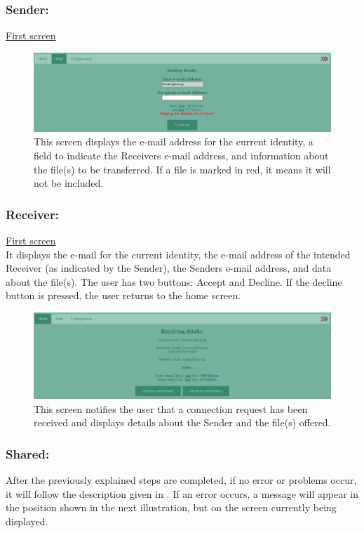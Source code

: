 \subsubsection*{Sender:}
%
\noindent
\underline{First screen}
\begin{figure}[H]
  \centering
  \includegraphics[width=\textwidth]{Figures/ACS/sending}
  \decoRule
  \caption[ACS mode: Sender screen]{This screen displays the e-mail address for the current identity, a field to indicate the Receivers e-mail address, and information about the file(s) to be transferred. If a file is marked in red, it means it will not be included.}
  \label{fig:ACS_send}
\end{figure}

\subsubsection*{Receiver:}
%
\noindent
\underline{First screen}\\
	It displays the e-mail for the current identity, the e-mail address of the intended Receiver (as indicated by the Sender), the Senders e-mail address, and data about the file(s). The user has two buttons: Accept and Decline. If the decline button is pressed, the user returns to the home screen.
\begin{figure}[H]
	\centering
	\includegraphics[width=\textwidth]{Figures/ACS/receiving}
	\decoRule
	\caption[ACS mode: Recipient screen]{This screen notifies the user that a connection request has been received and displays details about the Sender and the file(s) offered.}
  \label{fig:ACS_rec}
\end{figure}
%
\subsubsection*{Shared:}
After the previously explained steps are completed, if no error or problems occur, it will follow the description given in . If an error occurs, a message will appear in the position shown in the next illustration, but on the screen currently being displayed.

